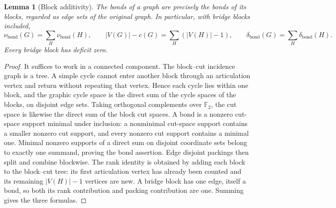 \documentclass[11pt]{article}
\newtheorem{lemma}[theorem]{Lemma}
\newcommand{\bond}{\operatorname{bond}}
\begin{document}
\begin{lemma}[Block additivity]\label{lem:blocks}
The bonds of a graph are precisely the bonds of its blocks,
regarded as edge sets of the original graph.  In particular, with
bridge blocks included,
\[
 \nu_{\bond}(G)=\sum_H\nu_{\bond}(H),\qquad
 |V(G)|-c(G)=\sum_H(|V(H)|-1),\qquad
 \delta_{\bond}(G)=\sum_H\delta_{\bond}(H).
\]
Every bridge block has deficit zero.
\end{lemma}
\begin{proof}
It suffices to work in a connected component.  The block--cut
incidence graph is a tree.  A simple cycle cannot enter another block
through an articulation vertex and return without repeating that
vertex.  Hence each cycle lies within one block, and the graphic
cycle space is the direct sum of the cycle spaces of the
blocks, on disjoint edge sets.  Taking orthogonal complements over
$\mathbb F_2$, the cut space is likewise the direct sum of the block
cut spaces.  A bond is a nonzero cut-space support minimal under
inclusion: a nonminimal cut-space support contains a smaller nonzero
cut support, and every nonzero cut support contains a minimal one.
Minimal nonzero supports of a direct sum on disjoint coordinate sets
belong to exactly one summand, proving the bond assertion.  Edge
disjoint packings then split and combine blockwise.  The rank identity
is obtained by adding each block to the block--cut tree: its first
articulation vertex has already been counted and its remaining
$|V(H)|-1$ vertices are new.  A bridge block has one edge, itself
a bond, so both its rank contribution and packing contribution are
one.  Summing gives the three formulas.
\end{proof}
\end{document}

